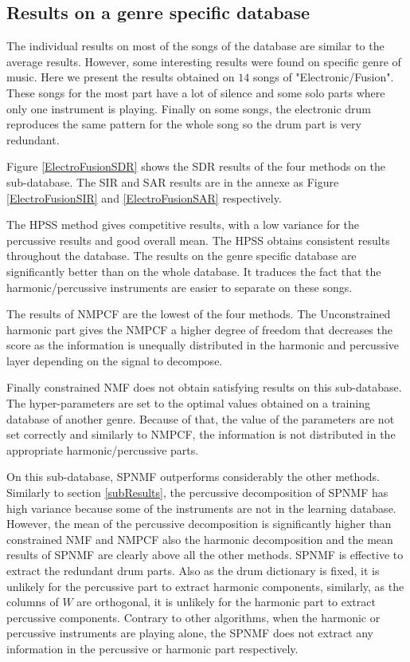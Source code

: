 \documentclass[journal]{IEEEtran}
\begin{document}
\subsection{Results on a genre specific database}\label{sec:subdata}

The individual results on most of the songs of the database are similar to the average results. However, some interesting results were found on specific genre of music. Here we present the results obtained on $14$ songs of "Electronic/Fusion". These songs for the most part have a lot of silence and some solo parts where only one instrument is playing. Finally on some songs, the electronic drum reproduces the same pattern for the whole song so the drum part is very redundant.

Figure \ref{ElectroFusionSDR} shows the SDR results of the four methods on the sub-database. The SIR and SAR results are in the annexe as Figure \ref{ElectroFusionSIR} and \ref{ElectroFusionSAR} respectively. 


The HPSS method gives competitive results, with a low variance for the percussive results and good overall mean. The HPSS obtains consistent results throughout the database. The results on the genre specific database are significantly better than on the whole database. It traduces the fact that the harmonic/percussive instruments are easier to separate on these songs. 
 
The results of NMPCF are the lowest of the four methods. The Unconstrained harmonic part gives the NMPCF a higher degree of freedom that decreases the score as the information is unequally distributed in the harmonic and percussive layer depending on the signal to decompose. 

Finally constrained NMF does not obtain satisfying results on this sub-database. The hyper-parameters are set to the optimal values obtained on a training database of another genre. Because of that, the value of the parameters are not set correctly and similarly to NMPCF, the information is not distributed in the appropriate harmonic/percussive parts. 


On this sub-database, SPNMF outperforms considerably the other methods. Similarly to section \ref{subResults}, the percussive decomposition of SPNMF has high variance because some of the instruments are not in the learning database. However, the mean of the percussive decomposition is significantly higher than constrained NMF and NMPCF also the harmonic decomposition and the mean results of SPNMF are clearly above all the other methods. SPNMF is effective to extract the redundant drum parts. Also as the drum dictionary is fixed, it is unlikely for the percussive part to extract harmonic components, similarly, as the columns of $W$ are orthogonal, it is unlikely for the harmonic part to extract percussive components. Contrary to other algorithms, when the harmonic or percussive instruments are playing alone, the SPNMF does not extract any information in the percussive or harmonic part respectively.
\end{document}
